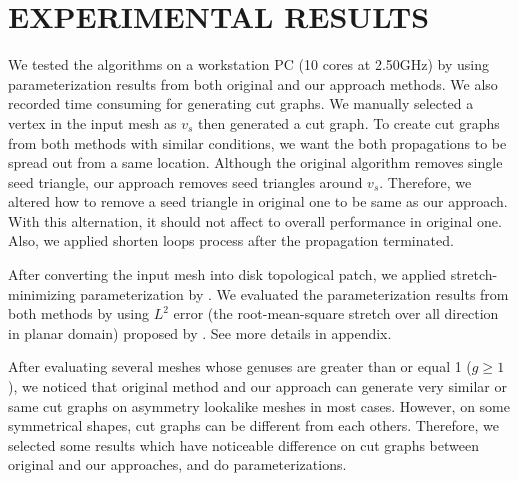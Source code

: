 \documentclass[a4paper,twoside]{article}
\begin{document}
\section{\uppercase{Experimental Results}}
\label{sec:Experiment Results}
\noindent We tested the algorithms on a workstation PC (10 cores at 2.50GHz) by using parameterization results from both original and our approach methods. We also recorded time consuming for generating cut graphs. We manually selected a vertex in the input mesh as $v_s$ then generated a cut graph. To create cut graphs from both methods with similar conditions, we want the both propagations to be spread out from a same location. Although the original algorithm removes single seed triangle, our approach removes seed triangles around $v_s$. Therefore, we altered how to remove a seed triangle in original one to be same as our approach. With this alternation, it should not affect to overall performance in original one. Also, we applied shorten loops process after the propagation terminated.

After converting the input mesh into disk topological patch, we applied stretch-minimizing parameterization by \cite{Yoshizawa_SMI04}.  We evaluated the parameterization results from both methods by using $L^2$ error (the root-mean-square stretch over all direction in planar domain) proposed by \cite{Sander:2001:TMP:383259.383307,Sander:2002:SP:581896.581909}. See more details in appendix.   

After evaluating several meshes whose genuses are greater than or equal 1 ($g \geq 1$), we noticed that original method and our approach can generate very similar or same cut graphs on asymmetry lookalike meshes in most cases. However, on some symmetrical shapes, cut graphs can be different from each others. Therefore, we selected some results which have noticeable difference on cut graphs between original and our approaches, and do parameterizations.
\end{document}
